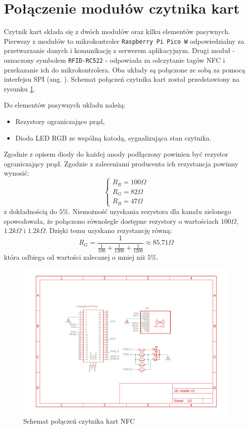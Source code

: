 \section{Połączenie modułów czytnika kart}

Czytnik kart składa się z dwóch modułów oraz kilku elementów pasywnych. Pierwszy z modułów to mikrokontroler \texttt{Raspberry Pi Pico W} odpowiedzialny za przetwarzanie danych i komunikację z serwerem aplikacyjnym. Drugi moduł - oznaczony symbolem \texttt{RFID-RC522} - odpowiada za odczytanie tagów NFC i przekazanie ich do mikrokontrolera. Oba układy są połączone ze sobą za pomocą interfejsu SPI (ang. ). Schemat połączeń czytnika kart został przedstawiony na rysunku \ref{fig:readerConnection}.

Do elementów pasywnych układu należą:
\begin{itemize}
    \item Rezystory ograniczające prąd,
    \item Dioda LED RGB ze wspólną katodą, sygnalizująca stan czytnika.
\end{itemize}

Zgodnie z opisem diody do każdej anody podłączony powinien być rezystor ograniczający prąd. Zgodnie z zaleceniami producenta ich rezystancja powinny wynosić:
\begin{equation}
    \begin{cases}
        R_R=100\Omega \\
        R_G=82\Omega  \\
        R_B=47\Omega
    \end{cases}
\end{equation}
z dokładnością do $5\%$. Niemożność uzyskania rezystora dla kanału zielonego spowodowała, że połączono równolegle dostępne rezystory o wartościach $100\Omega$, $1.2k\Omega$ i $1.2k\Omega$. Dzięki temu uzyskano rezystancję równą:
\begin{equation}
    R_G = \frac{1}{\frac{1}{100}+\frac{1}{1200}+\frac{1}{1200}} \approx 85.71\Omega
\end{equation}
która odbiega od wartości zalecanej o mniej niż $5\%$.
\begin{figure}[H]
    \centering
    \includegraphics[width=\textwidth]{graf/nfcReader.pdf}
    \caption{Schemat połączeń czytnika kart NFC}
    \label{fig:readerConnection}
\end{figure}